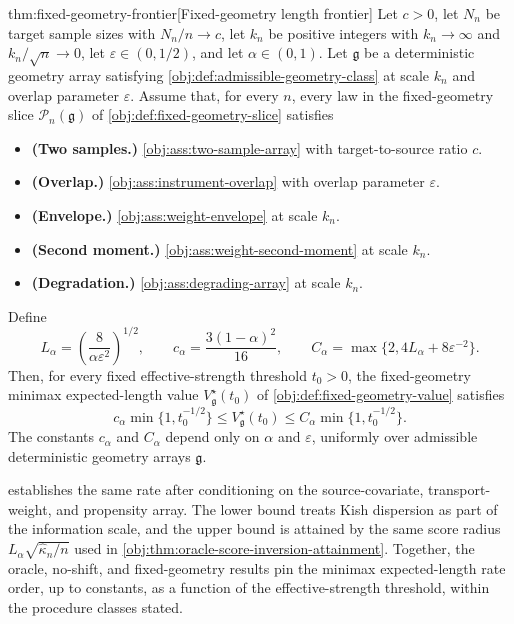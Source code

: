 \documentclass[11pt]{article}
\begin{document}
\begin{theoremv}{thm:fixed-geometry-frontier}[Fixed-geometry length frontier]
Let \(c>0\), let \(N_n\) be target sample sizes with \(N_n/n\to c\), let \(k_n\) be positive integers with \(k_n\to\infty\) and \(k_n/\sqrt n\to0\), let \(\varepsilon\in(0,1/2)\), and let \(\alpha\in(0,1)\).  Let \(\mathfrak g\) be a deterministic geometry array satisfying \cref{obj:def:admissible-geometry-class} at scale \(k_n\) and overlap parameter \(\varepsilon\).  Assume that, for every \(n\), every law in the fixed-geometry slice \(\mathcal P_n(\mathfrak g)\) of \cref{obj:def:fixed-geometry-slice} satisfies
\begin{itemize}
\item \textbf{(Two samples.)} \cref{obj:ass:two-sample-array} with target-to-source ratio \(c\).
\item \textbf{(Overlap.)} \cref{obj:ass:instrument-overlap} with overlap parameter \(\varepsilon\).
\item \textbf{(Envelope.)} \cref{obj:ass:weight-envelope} at scale \(k_n\).
\item \textbf{(Second moment.)} \cref{obj:ass:weight-second-moment} at scale \(k_n\).
\item \textbf{(Degradation.)} \cref{obj:ass:degrading-array} at scale \(k_n\).
\end{itemize}
Define
\[
L_\alpha=\left(\frac{8}{\alpha\varepsilon^2}\right)^{1/2},
\qquad
c_\alpha=\frac{3(1-\alpha)^2}{16},
\qquad
C_\alpha=\max\{2,4L_\alpha+8\varepsilon^{-2}\}.
\]
Then, for every fixed effective-strength threshold \(t_0>0\), the fixed-geometry minimax expected-length value \(V_{\mathfrak g}^\star(t_0)\) of \cref{obj:def:fixed-geometry-value} satisfies
\[
c_\alpha\min\{1,t_0^{-1/2}\}
\le
V_{\mathfrak g}^\star(t_0)
\le
C_\alpha\min\{1,t_0^{-1/2}\}.
\]
The constants \(c_\alpha\) and \(C_\alpha\) depend only on \(\alpha\) and \(\varepsilon\), uniformly over admissible deterministic geometry arrays \(\mathfrak g\).
\end{theoremv}

 establishes the same rate after conditioning on the source-covariate, transport-weight, and propensity array. The lower bound treats Kish dispersion as part of the information scale, and the upper bound is attained by the same score radius \(L_\alpha\sqrt{\widehat\kappa_n/n}\) used in \cref{obj:thm:oracle-score-inversion-attainment}. Together, the oracle, no-shift, and fixed-geometry results pin the minimax expected-length rate order, up to constants, as a function of the effective-strength threshold, within the procedure classes stated.
\end{document}

